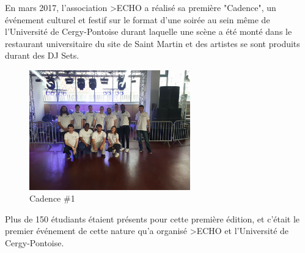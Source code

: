         En mars 2017, l'association >ECHO a réalisé sa première "Cadence", un événement culturel et festif sur le format d'une soirée au sein même de l'Université de Cergy-Pontoise durant laquelle une scène a été monté dans le restaurant universitaire du site de Saint Martin et des artistes se sont produits durant des DJ Sets.
        
        \begin{figure}[ht]
            \centering
            \includegraphics[width=0.62\textwidth]{images/cadencestaff.jpg}
            \caption{Cadence \#1}
        \end{figure}
        
        Plus de 150 étudiants étaient présents pour cette première édition, et c'était le premier événement de cette nature qu'a organisé >ECHO et l'Université de Cergy-Pontoise.


